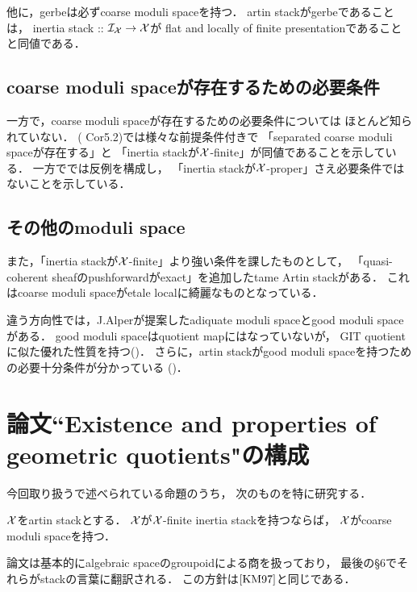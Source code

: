     他に，gerbeは必ずcoarse moduli spaceを持つ．
    artin stackがgerbeであることは，
    inertia stack :: $\mathcal{I}_{\mathcal{X}} \to \mathcal{X}$が
    flat and locally of finite presentationであることと同値である．

    \subsection{coarse moduli spaceが存在するための必要条件}
    一方で，coarse moduli spaceが存在するための必要条件については
    ほとんど知られていない．
    (\cite{Con05} Cor5.2)では様々な前提条件付きで
    「separated coarse moduli spaceが存在する」と
    「inertia stackが$\mathcal{X}$-finite」が同値であることを示している．
    一方で\cite{Rydh13}では反例を構成し，
    「inertia stackが$\mathcal{X}$-proper」さえ必要条件ではないことを示している．

    \subsection{その他のmoduli space}
    また，「inertia stackが$\mathcal{X}$-finite」より強い条件を課したものとして，
    「quasi-coherent sheafのpushforwardがexact」を追加したtame Artin stackがある．
    これはcoarse moduli spaceがetale localに綺麗なものとなっている．

    違う方向性では，J.Alperが提案したadiquate moduli spaceとgood moduli spaceがある．
    good moduli spaceはquotient mapにはなっていないが，
    GIT quotientに似た優れた性質を持つ(\cite{Alp13})．
    さらに，artin stackがgood moduli spaceを持つための必要十分条件が分かっている
    (\cite{AHLH18})．

\section{論文``Existence and properties of geometric quotients"の構成}
    今回取り扱う\cite{Rydh13}で述べられている命題のうち，
    次のものを特に研究する．
    \begin{Thm}
        $\mathcal{X}$をartin stackとする．
        $\mathcal{X}$が$\mathcal{X}$-finite inertia stackを持つならば，
        $\mathcal{X}$がcoarse moduli spaceを持つ．
    \end{Thm}
    論文は基本的にalgebraic spaceのgroupoidによる商を扱っており，
    最後の\S 6でそれらがstackの言葉に翻訳される．
    この方針は$\cite{KM97}$と同じである．


